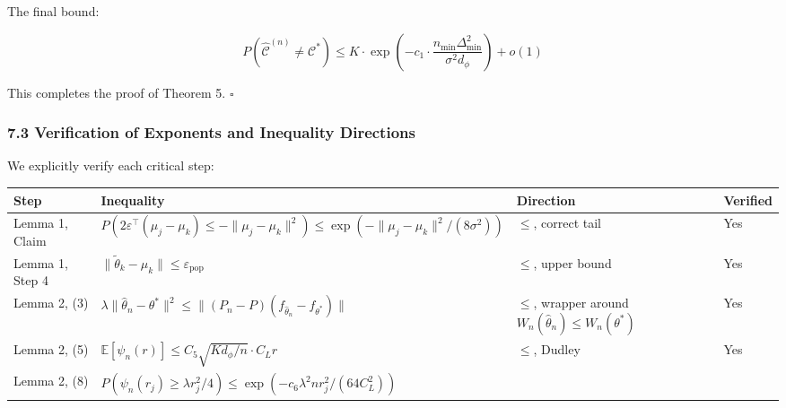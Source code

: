 \documentclass[
  12pt,
]{article}
\begin{document}
The final bound:

\[P(\hat{\mathcal{C}}^{(n)} \neq \mathcal{C}^*) \leq K \cdot \exp\left(-c_1 \cdot \frac{n_{\min} \Delta_{\min}^2}{\sigma^2 d_\phi}\right) + o(1)\]

This completes the proof of Theorem 5. \(\square\)

\subsubsection{7.3 Verification of Exponents and Inequality
Directions}\label{verification-of-exponents-and-inequality-directions}

We explicitly verify each critical step:

\begin{longtable}[]{@{}
  >{\raggedright\arraybackslash}p{}
  >{\raggedright\arraybackslash}p{}
  >{\raggedright\arraybackslash}p{}
  >{\raggedright\arraybackslash}p{}@{}}
\toprule\noalign{}
\begin{minipage}[b]{\linewidth}\raggedright
Step
\end{minipage} & \begin{minipage}[b]{\linewidth}\raggedright
Inequality
\end{minipage} & \begin{minipage}[b]{\linewidth}\raggedright
Direction
\end{minipage} & \begin{minipage}[b]{\linewidth}\raggedright
Verified
\end{minipage} \\
\midrule\noalign{}
\endhead
\bottomrule\noalign{}
\endlastfoot
Lemma 1, Claim &
\(P(2\varepsilon^\top(\mu_j - \mu_k) \leq -\|\mu_j-\mu_k\|^2) \leq \exp(-\|\mu_j-\mu_k\|^2/(8\sigma^2))\)
& \(\leq\), correct tail & Yes \\
Lemma 1, Step 4 &
\(\|\tilde{\theta}_k - \mu_k\| \leq \varepsilon_{\text{pop}}\) &
\(\leq\), upper bound & Yes \\
Lemma 2, (3) &
\(\lambda\|\hat{\theta}_n - \theta^*\|^2 \leq \|(P_n-P)(f_{\hat{\theta}_n} - f_{\theta^*})\|\)
& \(\leq\), wrapper around \(W_n(\hat{\theta}_n) \leq W_n(\theta^*)\) &
Yes \\
Lemma 2, (5) &
\(\mathbb{E}[\psi_n(r)] \leq C_5\sqrt{K d_\phi/n}\cdot C_L r\) &
\(\leq\), Dudley & Yes \\
Lemma 2, (8) &
\(P(\psi_n(r_j) \geq \lambda r_j^2/4) \leq \exp(-c_6 \lambda^2 n r_j^2/(64 C_L^2))\)

\end{longtable}
\end{document}
